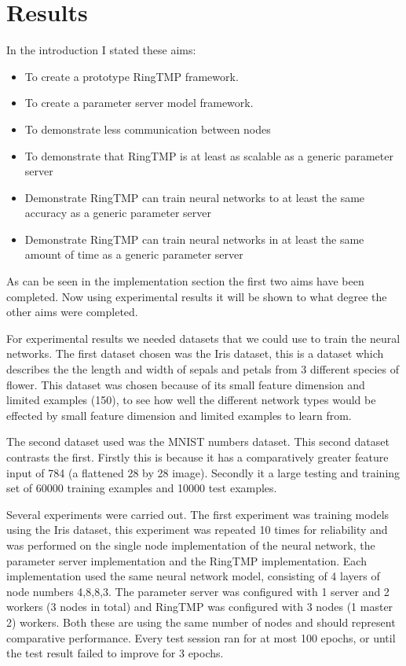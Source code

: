 \clearpage
\section{Results}
In the introduction I stated these aims:
\begin{itemize}
    \item To create a prototype RingTMP framework.
    \item To create a parameter server model framework.
    \item To demonstrate less communication between nodes
    \item To demonstrate that RingTMP is at least as scalable as a generic parameter
    server
    \item Demonstrate RingTMP can train neural networks to at least the same
    accuracy as a generic parameter server
    \item Demonstrate RingTMP can train neural networks in at least the same
    amount of time as a generic parameter server
\end{itemize}

As can be seen in the implementation section the first two aims have been
completed. Now using experimental results it will be shown to what degree the
other aims were completed.

For experimental results we needed datasets that we could use to train the
neural networks. The first dataset chosen was the Iris dataset, this is a
dataset which describes the the length and width of sepals and petals from 3
different species of flower. This dataset was chosen because of its small
feature dimension and limited examples (150), to see how well the different
network types would be effected by small feature dimension and limited examples
to learn from.

The second dataset used was the MNIST numbers dataset. \cite{lecun2010mnist}
This second dataset contrasts the first. Firstly this is because it has a
comparatively greater feature input of 784 (a flattened 28 by 28 image).
Secondly it a large testing and training set of 60000 training examples and 10000
test examples.

Several experiments were carried out. The first experiment was training models
using the Iris dataset, this experiment was repeated 10 times for reliability
and was performed on the single node implementation of the neural network, the
parameter server implementation and the RingTMP implementation. Each
implementation used the same neural network model, consisting of 4 layers of
node numbers 4,8,8,3. The parameter server was configured with 1 server and 2
workers (3 nodes in total) and RingTMP was configured with 3 nodes (1 master 2)
workers. Both these are using the same number of nodes and should represent
comparative performance. Every test session ran for at most 100 epochs, or until the
test result failed to improve for 3 epochs.

